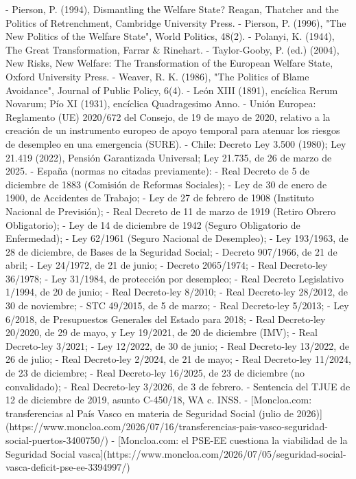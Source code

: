 \documentclass[10pt,a4paper]{article}
\begin{document}
- Pierson, P. (1994), Dismantling the Welfare State? Reagan, Thatcher and the Politics of Retrenchment, Cambridge University Press.
- Pierson, P. (1996), "The New Politics of the Welfare State", World Politics, 48(2).
- Polanyi, K. (1944), The Great Transformation, Farrar & Rinehart.
- Taylor-Gooby, P. (ed.) (2004), New Risks, New Welfare: The Transformation of the European Welfare State, Oxford University Press.
- Weaver, R. K. (1986), "The Politics of Blame Avoidance", Journal of Public Policy, 6(4).
- León XIII (1891), encíclica Rerum Novarum; Pío XI (1931), encíclica Quadragesimo Anno.
- Unión Europea: Reglamento (UE) 2020/672 del Consejo, de 19 de mayo de 2020, relativo a la creación de un instrumento europeo de apoyo temporal para atenuar los riesgos de desempleo en una emergencia (SURE).
- Chile: Decreto Ley 3.500 (1980); Ley 21.419 (2022), Pensión Garantizada Universal; Ley 21.735, de 26 de marzo de 2025.
- España (normas no citadas previamente):
  - Real Decreto de 5 de diciembre de 1883 (Comisión de Reformas Sociales);
  - Ley de 30 de enero de 1900, de Accidentes de Trabajo;
  - Ley de 27 de febrero de 1908 (Instituto Nacional de Previsión);
  - Real Decreto de 11 de marzo de 1919 (Retiro Obrero Obligatorio);
  - Ley de 14 de diciembre de 1942 (Seguro Obligatorio de Enfermedad);
  - Ley 62/1961 (Seguro Nacional de Desempleo);
  - Ley 193/1963, de 28 de diciembre, de Bases de la Seguridad Social;
  - Decreto 907/1966, de 21 de abril;
  - Ley 24/1972, de 21 de junio;
  - Decreto 2065/1974;
  - Real Decreto-ley 36/1978;
  - Ley 31/1984, de protección por desempleo;
  - Real Decreto Legislativo 1/1994, de 20 de junio;
  - Real Decreto-ley 8/2010;
  - Real Decreto-ley 28/2012, de 30 de noviembre;
  - STC 49/2015, de 5 de marzo;
  - Real Decreto-ley 5/2013;
  - Ley 6/2018, de Presupuestos Generales del Estado para 2018;
  - Real Decreto-ley 20/2020, de 29 de mayo, y Ley 19/2021, de 20 de diciembre (IMV);
  - Real Decreto-ley 3/2021;
  - Ley 12/2022, de 30 de junio;
  - Real Decreto-ley 13/2022, de 26 de julio;
  - Real Decreto-ley 2/2024, de 21 de mayo;
  - Real Decreto-ley 11/2024, de 23 de diciembre;
  - Real Decreto-ley 16/2025, de 23 de diciembre (no convalidado);
  - Real Decreto-ley 3/2026, de 3 de febrero.
- Sentencia del TJUE de 12 de diciembre de 2019, asunto C-450/18, WA c. INSS.
- [Moncloa.com: transferencias al País Vasco en materia de Seguridad Social (julio de 2026)](https://www.moncloa.com/2026/07/16/transferencias-pais-vasco-seguridad-social-puertos-3400750/)
- [Moncloa.com: el PSE-EE cuestiona la viabilidad de la Seguridad Social vasca](https://www.moncloa.com/2026/07/05/seguridad-social-vasca-deficit-pse-ee-3394997/)
\end{document}
